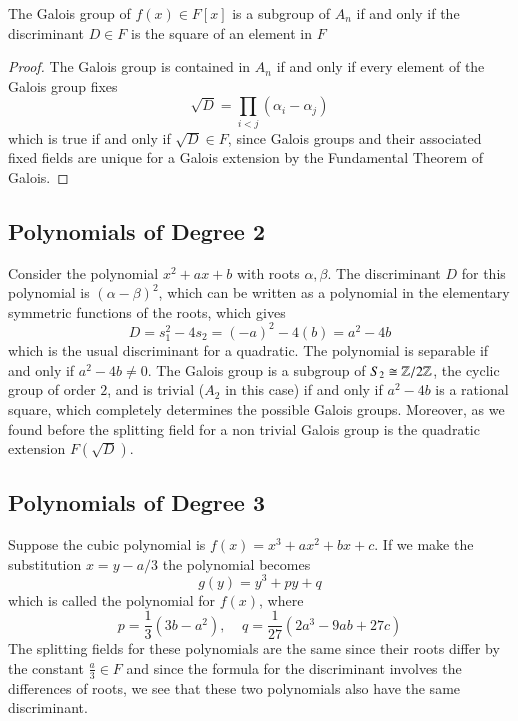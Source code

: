 \begin{prop}
    The Galois group of $f(x) \in F[x]$ is a subgroup of $A_n$ if and only if the discriminant $D \in F$ is the square of an element in $F$
\end{prop}
\begin{proof}
    The Galois group is contained in $A_n$ if and only if every element of the Galois group fixes \begin{equation*}
        \sqrt{D} = \prod_{i < j}(\alpha_i - \alpha_j)
    \end{equation*}
    which is true if and only if $\sqrt{D} \in F$, since Galois groups and their associated fixed fields are unique for a Galois extension by the Fundamental Theorem of Galois.
\end{proof}


\subsection{Polynomials of Degree 2}

Consider the polynomial $x^2+ax+b$ with roots $\alpha,\beta$. The discriminant $D$ for this polynomial is $(\alpha-\beta)^2$, which can be written as a polynomial in the elementary symmetric functions of the roots, which gives $$D = s_1^2-4s_2 = (-a)^2-4(b) = a^2-4b$$
which is the usual discriminant for a quadratic. The polynomial is separable if and only if $a^2-4b \neq 0$. The Galois group is a subgroup of $S_2 \cong \mathbb Z/2\mathbb Z$, the cyclic group of order $2$, and is trivial ($A_2$ in this case) if and only if $a^2-4b$ is a rational square, which completely determines the possible Galois groups. Moreover, as we found before the splitting field for a non trivial Galois group is the quadratic extension $F(\sqrt{D})$.


\subsection{Polynomials of Degree 3}

Suppose the cubic polynomial is $f(x) = x^3+ax^2+bx+c$. If we make the substitution $x = y-a/3$ the polynomial becomes \begin{equation*}
    g(y) = y^3+py+q
\end{equation*}
which is called the  polynomial for $f(x)$, where \begin{equation*}
    p = \frac{1}{3}(3b-a^2),\;\;\;\;q = \frac{1}{27}(2a^3-9ab+27c)
\end{equation*}
The splitting fields for these polynomials are the same since their roots differ by the constant $\frac{a}{3} \in F$ and since the formula for the discriminant involves the differences of roots, we see that these two polynomials also have the same discriminant.


